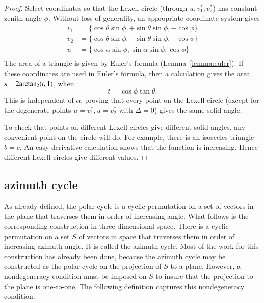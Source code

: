 \begin{proof}  Select coordinates so that the Lexell circle (through $u,v^*_1,v^*_2$) has constant zenith angle $\phi$.  Without loss of generality,  an appropriate coordinate system gives 
%
%
$$
\begin{array}{lll}
v_1 &= \{\cos\theta\sin\phi,+\sin\theta\sin\phi,-\cos\phi\}\\
v_2 &= \{\cos\theta\sin\phi,-\sin\theta\sin\phi,-\cos\phi\}\\
u &= \{\cos\alpha\sin\phi,\sin\alpha\sin\phi,\cos\phi\}\\
\end{array}
$$
The area of a triangle is given by Euler's formula (Lemma~\ref{lemma:euler}).  If these coordinates are used in Euler's formula,
then a calculation gives the area $\pi-2{\operatorname{arctan_2}}(t,1)$, when
$$
t=\cos\phi \tan\theta.
$$
This is independent of $\alpha$, proving that every point on the Lexell circle (except for the degenerate points $u= v^*_1,u=v^*_2$ with $\Delta=0$) gives the same solid angle.
%

To check that points on different Lexell circles give different solid angles,  any convenient point on the circle will do.  For example, there is an isosceles triangle $b=c$.  An easy derivative calculation shows that the function is increasing.  Hence different Lexell circles give different values.
\end{proof}
%


\subsection{azimuth cycle}

As already defined, the polar cycle is a cyclic permutation on a set
of vectors in the plane that traverses them in order of increasing
angle.  What follows is the corresponding construction in three dimensional
space.  There is  a cyclic permutation on a set $S$ of vectors in space
that traverses them in order of increasing azimuth angle.  It is called 
the azimuth cycle.  Most of the work for this construction has already been done, because the azimuth cycle may be constructed as the polar cycle on the projection of $S$ to a plane.  However, 
a nondegeneracy condition must be imposed on $S$ to insure that
the projection to the plane is one-to-one.  The following
definition captures this nondegeneracy condition.
%
%
%
%


